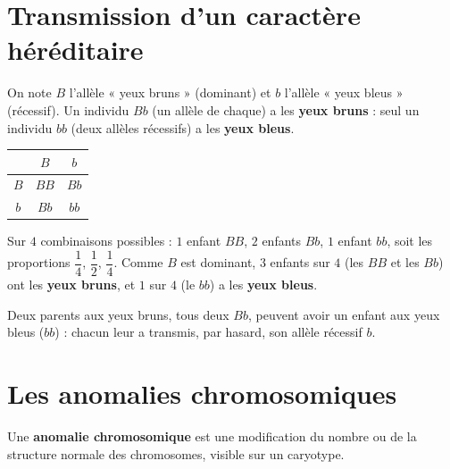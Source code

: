 \section{Transmission d'un caractère héréditaire}

\begin{propriete}
On note $B$ l'allèle « yeux bruns » (dominant) et $b$ l'allèle « yeux bleus »
(récessif). Un individu $Bb$ (un allèle de chaque) a les \textbf{yeux bruns} : seul un
individu $bb$ (deux allèles récessifs) a les \textbf{yeux bleus}.
\end{propriete}

\begin{illus}
\begin{center}
\small
\begin{tabular}{c|cc}
& $B$ & $b$ \\
\hline
$B$ & $BB$ & $Bb$ \\
$b$ & $Bb$ & $bb$ \\
\end{tabular}
\end{center}
\end{illus}

\begin{propriete}
Sur $4$ combinaisons possibles : $1$ enfant $BB$, $2$ enfants $Bb$, $1$ enfant $bb$, soit
les proportions $\dfrac14$, $\dfrac12$, $\dfrac14$. Comme $B$ est dominant, $3$ enfants
sur $4$ (les $BB$ et les $Bb$) ont les \textbf{yeux bruns}, et $1$ sur $4$ (le $bb$) a les
\textbf{yeux bleus}.
\end{propriete}

\begin{exemple}
Deux parents aux yeux bruns, tous deux $Bb$, peuvent avoir un enfant aux yeux bleus
($bb$) : chacun leur a transmis, par hasard, son allèle récessif $b$.
\end{exemple}

\section{Les anomalies chromosomiques}

\begin{definition}
Une \textbf{anomalie chromosomique} est une modification du nombre ou de la structure
normale des chromosomes, visible sur un caryotype.
\end{definition}

